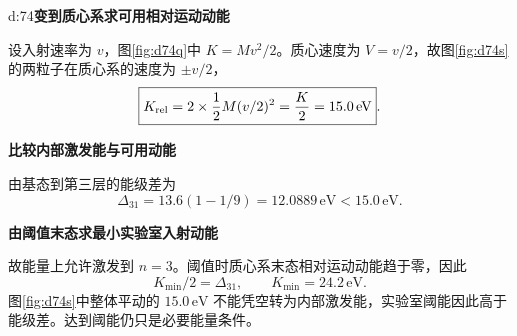 \begin{drillsolution}{d:74}\textbf{变到质心系求可用相对运动动能}\par\nobreak
设入射速率为 \(v\)，图\ref{fig:d74q}中 \(K=Mv^2/2\)。质心速度为 \(V=v/2\)，故图\ref{fig:d74s}的两粒子在质心系的速度为 \(\pm v/2\)，
\[
 \boxed{K_{\rm rel}=2\times\frac12M(v/2)^2=\frac K2=15.0\,\mathrm{eV}}.
\]


\par\medskip{}\noindent\textbf{比较内部激发能与可用动能}\par\nobreak
由基态到第三层的能级差为
\[
 \Delta_{31}=13.6(1-1/9)=12.0889\,\mathrm{eV}<15.0\,\mathrm{eV}.
\]


\par\medskip{}\noindent\textbf{由阈值末态求最小实验室入射动能}\par\nobreak
故能量上允许激发到 \(n=3\)。阈值时质心系末态相对运动动能趋于零，因此
\[
 K_{\min}/2=\Delta_{31},\qquad
 \boxed{K_{\min}=24.2\,\mathrm{eV}}.
\]
图\ref{fig:d74s}中整体平动的 \(15.0\,\mathrm{eV}\) 不能凭空转为内部激发能，实验室阈能因此高于能级差。达到阈能仍只是必要能量条件。




\end{drillsolution}
